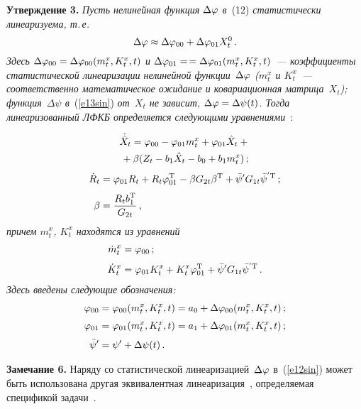 \begin{multicols}{2}
\medskip

\noindent
\textbf{Утверждение 3.}
\textit{Пусть нелинейная функция $\Delta\varphi$ в}~(12) \textit{статистически линеаризуема, т.\,е.
\begin{equation*}
\Delta\varphi \approx\Delta\varphi_{00} +\Delta\varphi_{01} X_t^0\,.
\end{equation*}
Здесь $\Delta\varphi_{00}=\Delta\varphi_{00} (m_t^x, K_t^x, t)$  и 
$\Delta\varphi_{01}=$\linebreak $=\Delta\varphi_{01}(m_t^x, K_t^x, t)$~--- коэффициенты статистической линеаризации нелинейной 
функции~$\Delta\varphi$ ($m_t^x$ и $K_t^x$~--- соответственно математическое ожидание и ковариационная матрица~$X_t$); 
функция~$\Delta\psi$ в}~(\ref{e13sin}) \textit{от~$X_t$ не зависит, 
$\Delta\varphi=\Delta\psi(t)$. Тогда линеаризованный ЛФКБ определяется следующими уравнениями}~\cite{4sin}:

\noindent
\begin{multline*}
\dot{\hat X}_t =\vrp_{00} -\vrp_{01} m_t^x + \vrp_{01} \hat X_t +{}\\
{}+\beta ( Z_t - b_1 \hat X_t - b_0 + b_1 m_t^x)\,; %
\end{multline*}
\begin{align*}
\dot R_t &=\vrp_{01} R_t + R_t \vrp_{01}^{\mathrm{T}} -\beta G_{2t} \beta^{\mathrm{T}}
+ \bar\psi' G_{1t}\bar\psi^{'\mathrm{T}}\,; %
\\[3pt]
\beta &= \fr{R_t b_1^{\mathrm{T}} }{G_{2t}}\,, %
\end{align*}
\textit{причем  $m_t^x$, $K_t^x$ находятся из уравнений}
\begin{align*}
\dot m_t^x &=\vrp_{00}\,; %
\\[3pt]
\dot K_t^x &=\vrp_{01} K_t^x + K_t^x \vrp_{01}^{\mathrm{T}} +\bar\psi' G_{1t}\bar\psi^{'\mathrm{T}}\,. %
\end{align*}
\textit{Здесь введены следующие обозначения:}
\begin{align*}
\varphi_{00} &=\varphi_{00}(m_t^x, K_t^x, t) = a_0 +\Delta\varphi_{00}(m_t^x, K_t^x, t)\,;\\[3pt]
\varphi_{01} &=\varphi_{01}(m_t^x, K_t^x, t) = a_1 +\Delta\varphi_{01}(m_t^x, K_t^x, t)\,;\\[3pt]
\bar\psi' &=\psi'+\Delta\psi(t)\,.
\end{align*}

\smallskip

\noindent
\textbf{Замечание 6.} Наряду со статистической линеаризацией~$\Delta \varphi$  в~(\ref{e12sin}) 
может быть использована другая эквивалентная линеаризация~\cite{4sin}, 
определяемая спецификой задачи~\cite{6sin, 8sin, 9sin}.


\end{multicols}
